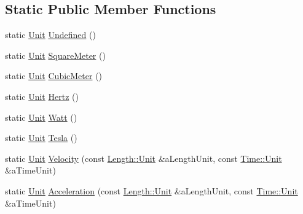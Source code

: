 \subsection*{Static Public Member Functions}
\begin{DoxyCompactItemize}
\item 
static \hyperlink{classlibrary_1_1physics_1_1units_1_1_derived_1_1_unit}{Unit} \hyperlink{classlibrary_1_1physics_1_1units_1_1_derived_1_1_unit_a0bd6544fb76067c5efc24b794e764301}{Undefined} ()
\item 
static \hyperlink{classlibrary_1_1physics_1_1units_1_1_derived_1_1_unit}{Unit} \hyperlink{classlibrary_1_1physics_1_1units_1_1_derived_1_1_unit_a5d30231014ef972169cca87c852cfee3}{Square\+Meter} ()
\item 
static \hyperlink{classlibrary_1_1physics_1_1units_1_1_derived_1_1_unit}{Unit} \hyperlink{classlibrary_1_1physics_1_1units_1_1_derived_1_1_unit_ad8e71820dabe4073b90ae3681f31b420}{Cubic\+Meter} ()
\item 
static \hyperlink{classlibrary_1_1physics_1_1units_1_1_derived_1_1_unit}{Unit} \hyperlink{classlibrary_1_1physics_1_1units_1_1_derived_1_1_unit_a3eb18a6cc5208068ea633533edddf0d3}{Hertz} ()
\item 
static \hyperlink{classlibrary_1_1physics_1_1units_1_1_derived_1_1_unit}{Unit} \hyperlink{classlibrary_1_1physics_1_1units_1_1_derived_1_1_unit_a242bb2e90f24200686e272312a2b05a9}{Watt} ()
\item 
static \hyperlink{classlibrary_1_1physics_1_1units_1_1_derived_1_1_unit}{Unit} \hyperlink{classlibrary_1_1physics_1_1units_1_1_derived_1_1_unit_aa2d930f2a465022d0cbf3c536624e909}{Tesla} ()
\item 
static \hyperlink{classlibrary_1_1physics_1_1units_1_1_derived_1_1_unit}{Unit} \hyperlink{classlibrary_1_1physics_1_1units_1_1_derived_1_1_unit_a14a4c4646fc7af71b1b295039526c7a1}{Velocity} (const \hyperlink{classlibrary_1_1physics_1_1units_1_1_length_a3b8b39cd245cf6b19dc34459baeccb18}{Length\+::\+Unit} \&a\+Length\+Unit, const \hyperlink{classlibrary_1_1physics_1_1units_1_1_time_ab876a6a05c9a2f28905f2753bfd64109}{Time\+::\+Unit} \&a\+Time\+Unit)
\item 
static \hyperlink{classlibrary_1_1physics_1_1units_1_1_derived_1_1_unit}{Unit} \hyperlink{classlibrary_1_1physics_1_1units_1_1_derived_1_1_unit_a0371d4157e5b4995c54989bb471f4a12}{Acceleration} (const \hyperlink{classlibrary_1_1physics_1_1units_1_1_length_a3b8b39cd245cf6b19dc34459baeccb18}{Length\+::\+Unit} \&a\+Length\+Unit, const \hyperlink{classlibrary_1_1physics_1_1units_1_1_time_ab876a6a05c9a2f28905f2753bfd64109}{Time\+::\+Unit} \&a\+Time\+Unit)

\end{DoxyCompactItemize}

